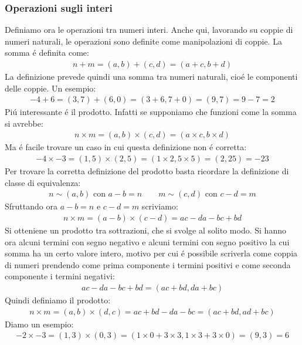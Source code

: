 \documentclass[twoside]{article} %
\begin{document}
	\subsubsection{Operazioni sugli interi}
	Definiamo ora le operazioni tra numeri interi. Anche qui, lavorando su coppie di numeri naturali, le operazioni sono definite come manipolazioni di coppie. La somma \'e definita come:
	\begin{gather*}
		n+m= (a,b)+(c,d)=(a+c,b+d)
	\end{gather*}
	La definizione prevede quindi una somma tra numeri naturali, cio\'e le componenti delle coppie. Un esempio:
	\begin{gather*}
		-4+6= (3,7)+(6,0)=(3+6,7+0)=(9,7)= 9-7= 2
	\end{gather*}
	Pi\'u interessante \'e il prodotto. Infatti se supponiamo che funzioni come la somma si avrebbe:
	\begin{gather*}
		n\times m= (a,b)\times (c,d)=(a\times c,b\times d)
	\end{gather*}
	Ma \'e facile trovare un caso in cui questa definizione non \'e corretta:
	\begin{gather*}
		-4\times -3= (1,5)\times (2,5)=(1\times 2, 5\times 5)=(2,25)= -23
	\end{gather*}
	Per trovare la corretta definizione del prodotto basta ricordare la definizione di classe di equivalenza:
	\begin{gather*}
		n\sim (a,b)\text{ con }a-b=n\qquad m\sim (c,d)\text{ con }c-d=m
	\end{gather*}
	Sfruttando ora $a-b=n$ e $c-d=m$ scriviamo:
	\begin{gather*}
		n\times m = (a-b)\times (c-d)=ac-da-bc+bd
	\end{gather*}
	Si otteniene un prodotto tra sottrazioni, che si svolge al solito modo. Si hanno ora alcuni termini con segno negativo e alcuni termini con segno positivo la cui somma ha un certo valore intero, motivo per cui \'e possibile scriverla come coppia di numeri prendendo come prima componente i termini positivi e come seconda componente i termini negativi:
	\begin{gather*}
		ac-da-bc+bd= (ac+bd,da+bc)
	\end{gather*}
	Quindi definiamo il prodotto:
	\begin{gather*}
		n\times m= (a,b)\times (d,c)=ac+bd-da-bc=(ac+bd,ad+bc) 		
	\end{gather*}
	Diamo un esempio:
	\begin{gather*}
		-2\times -3= (1,3)\times (0,3)=(1\times 0+3\times 3,1\times 3+3\times 0)=(9,3)=6
	\end{gather*}
	
\end{document}
